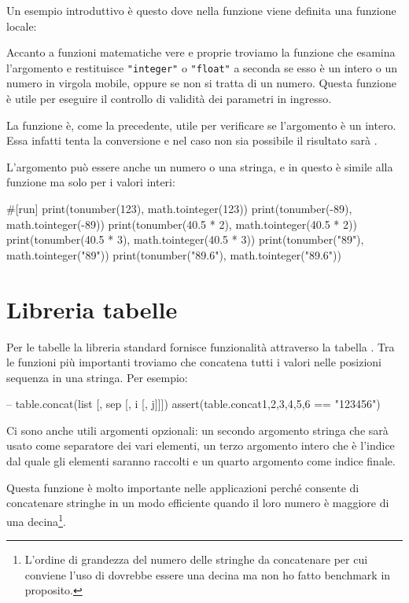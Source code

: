 Un esempio introduttivo è questo dove nella funzione  viene definita una
funzione locale:

Accanto a funzioni matematiche vere e proprie troviamo la funzione
 che esamina l'argomento e restituisce
\verb|"integer"| o \verb|"float"| a seconda se esso è un intero o un numero in
virgola mobile, oppure  se non si tratta di un numero. Questa funzione
è utile per eseguire il controllo di validità dei parametri in ingresso.

La funzione  è, come la precedente,
utile per verificare se l'argomento è un intero. Essa infatti tenta la
conversione e nel caso non sia possibile il risultato sarà . 

L'argomento può essere anche un numero o una stringa, e in questo è simile alla
funzione  ma solo per i valori interi:
\begin{lines}
#[run]
print(tonumber(123), math.tointeger(123))
print(tonumber(-89), math.tointeger(-89))
print(tonumber(40.5 * 2), math.tointeger(40.5 * 2))
print(tonumber(40.5 * 3), math.tointeger(40.5 * 3))
print(tonumber("89"), math.tointeger("89"))
print(tonumber("89.6"), math.tointeger("89.6"))
\end{lines}


\section{Libreria tabelle}
\label{iiSecTableLibrary}

Per le tabelle la libreria standard fornisce funzionalità attraverso la tabella
. Tra le funzioni più importanti troviamo
 che concatena tutti i valori nelle
posizioni sequenza in una stringa. Per esempio:
\begin{lines}
-- table.concat(list [, sep [, i [, j]]])
assert(table.concat{1,2,3,4,5,6} == "123456")
\end{lines}

Ci sono anche utili argomenti opzionali: un secondo argomento stringa che sarà
usato come separatore dei vari elementi, un terzo argomento intero che è
l'indice dal quale gli elementi saranno raccolti e un quarto argomento come
indice finale.

Questa funzione è molto importante nelle applicazioni perché consente di
concatenare stringhe in un modo efficiente quando il loro numero è maggiore di
una decina\footnote{L'ordine di grandezza del numero delle stringhe da
concatenare per cui conviene l'uso di  dovrebbe essere una
decina ma non ho fatto benchmark in proposito.}.

